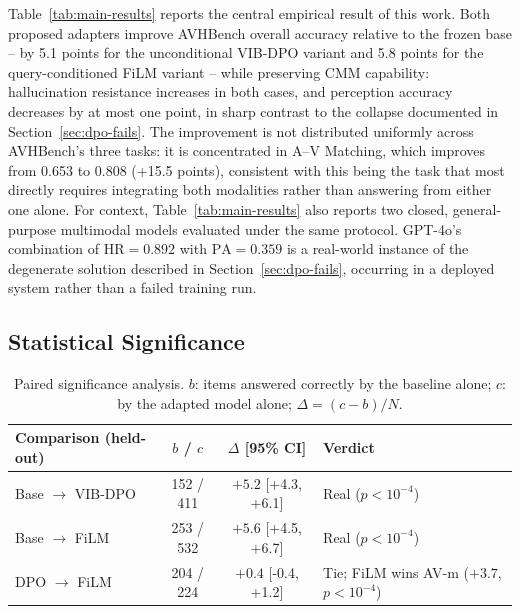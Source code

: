 \documentclass[11pt,a4paper,oneside]{article}
\begin{document}
Table~\ref{tab:main-results} reports the central empirical result of this work. Both proposed
adapters improve AVHBench overall accuracy relative to the frozen base -- by 5.1 points for the
unconditional VIB-DPO variant and 5.8 points for the query-conditioned FiLM variant -- while
preserving CMM capability: hallucination resistance increases in both cases, and perception accuracy
decreases by at most one point, in sharp contrast to the collapse documented in
Section~\ref{sec:dpo-fails}. The improvement is not distributed uniformly across AVHBench's three
tasks: it is concentrated in A--V Matching, which improves from 0.653 to 0.808 (+15.5 points),
consistent with this being the task that most directly requires integrating both modalities rather
than answering from either one alone. For context, Table~\ref{tab:main-results} also reports two
closed, general-purpose multimodal models evaluated under the same protocol. GPT-4o's combination of
$\mathrm{HR}=0.892$ with $\mathrm{PA}=0.359$ is a real-world instance of the degenerate solution
described in Section~\ref{sec:dpo-fails}, occurring in a deployed system rather than a
failed training run.

\subsection{Statistical Significance}
\label{sec:significance}

\begin{table}[h]
\centering
\small
\begin{tabular}{lccl}
\toprule
Comparison (held-out) & $b$ / $c$ & $\Delta$ [95\% CI] & Verdict \\
\midrule
Base $\to$ VIB-DPO & 152 / 411 & $+5.2$ [+4.3, +6.1] & Real ($p<10^{-4}$) \\
Base $\to$ FiLM     & 253 / 532 & $+5.6$ [+4.5, +6.7] & Real ($p<10^{-4}$) \\
DPO $\to$ FiLM      & 204 / 224 & $+0.4$ [-0.4, +1.2] & Tie; FiLM wins AV-m ($+3.7$, $p<10^{-4}$) \\
\bottomrule
\end{tabular}
\caption{Paired significance analysis. $b$: items answered correctly by the baseline alone; $c$: by
the adapted model alone; $\Delta=(c-b)/N$.}
\label{tab:significance}
\end{table}
\end{document}
